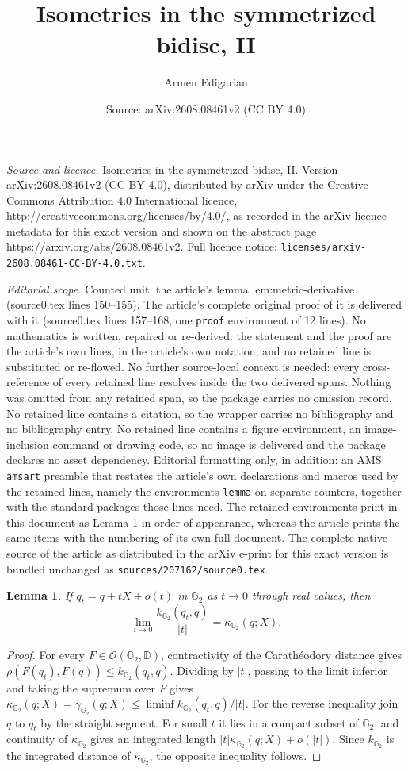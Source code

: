 \documentclass[10pt,a4paper]{amsart}
\title{Isometries in the symmetrized bidisc, II}
\author{Armen Edigarian}
\date{Source: arXiv:2608.08461v2 (CC BY 4.0)}
\newtheorem{lemma}{Lemma}
\newcommand{\DD}{\mathbb D}
\newcommand{\GG}{\mathbb G_2}
\begin{document}
\maketitle

\noindent\emph{Source and licence.} Isometries in the symmetrized bidisc, II. Version arXiv:2608.08461v2 (CC BY 4.0), distributed by arXiv under the Creative Commons Attribution 4.0 International licence, http://creativecommons.org/licenses/by/4.0/, as recorded in the arXiv licence metadata for this exact version and shown on the abstract page https://arxiv.org/abs/2608.08461v2. Full licence notice: \texttt{licenses/arxiv-2608.08461-CC-BY-4.0.txt}.\par\smallskip

\noindent\textit{Editorial scope.} Counted unit: the article's lemma lem:metric-derivative (source0.tex lines 150--155). The article's complete original proof of it is delivered with it (source0.tex lines 157--168, one \texttt{proof} environment of 12 lines). No mathematics is written, repaired or re-derived: the statement and the proof are the article's own lines, in the article's own notation, and no retained line is substituted or re-flowed.  No further source-local context is needed: every cross-reference of every retained line resolves inside the two delivered spans.  Nothing was omitted from any retained span, so the package carries no omission record.  No retained line contains a citation, so the wrapper carries no bibliography and no bibliography entry.  No retained line contains a figure environment, an image-inclusion command or drawing code, so no image is delivered and the package declares no asset dependency.  Editorial formatting only, in addition: an AMS \texttt{amsart} preamble that restates the article's own declarations and macros used by the retained lines, namely the environments \texttt{lemma} on separate counters, together with the standard packages those lines need.  The retained environments print in this document as Lemma 1 in order of appearance, whereas the article prints the same items with the numbering of its own full document.  The complete native source of the article as distributed in the arXiv e-print for this exact version is bundled unchanged as \texttt{sources/207162/source0.tex}.
\begin{lemma}\label{lem:metric-derivative}
If $q_t=q+tX+o(t)$ in $\GG$ as $t\to0$ through real values, then
\[
 \lim_{t\to0}\frac{k_{\GG}(q_t,q)}{|t|}=\kappa_{\GG}(q;X).
\]
\end{lemma}

\begin{proof}
For every $F\in\mathcal O(\GG,\DD)$, contractivity of the Carath\'eodory
distance gives
$\rho(F(q_t),F(q))\le k_{\GG}(q_t,q)$.  Dividing by $|t|$, passing to the
limit inferior and taking the supremum over $F$ gives
$\kappa_{\GG}(q;X)=\gamma_{\GG}(q;X)\le\liminf k_{\GG}(q_t,q)/|t|$.
For the reverse inequality join $q$ to $q_t$ by the straight segment.  For
small $t$ it lies in a compact subset of $\GG$, and continuity of
$\kappa_{\GG}$ gives an integrated length
$|t|\kappa_{\GG}(q;X)+o(|t|)$.  Since $k_{\GG}$ is the integrated distance of
$\kappa_{\GG}$, the opposite inequality follows.
\end{proof}
\end{document}

